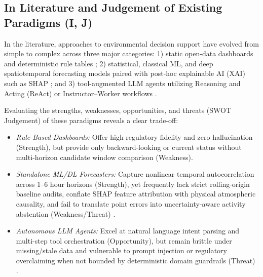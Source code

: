 \subsection{In Literature and Judgement of Existing Paradigms (I, J)}
In the literature, approaches to environmental decision support have evolved from simple to complex across three major categories: 1) static open-data dashboards and deterministic rule tables \cite{aqxp432,moenv2025aqi}; 2) statistical, classical ML, and deep spatiotemporal forecasting models paired with post-hoc explainable AI (XAI) such as SHAP \cite{chianese2026,joseph2025,lundberg2017,houdou2024,lo2025}; and 3) tool-augmented LLM agents utilizing Reasoning and Acting (ReAct) or Instructor--Worker workflows \cite{yao2023,nie2025,gao2025}.

Evaluating the strengths, weaknesses, opportunities, and threats (SWOT Judgement) of these paradigms reveals a clear trade-off:
\begin{itemize}
    \item \emph{Rule-Based Dashboards:} Offer high regulatory fidelity and zero hallucination (Strength), but provide only backward-looking or current status without multi-horizon candidate window comparison (Weakness).
    \item \emph{Standalone ML/DL Forecasters:} Capture nonlinear temporal autocorrelation across 1--6 hour horizons (Strength), yet frequently lack strict rolling-origin baseline audits, conflate SHAP feature attribution with physical atmospheric causality, and fail to translate point errors into uncertainty-aware activity abstention (Weakness/Threat) \cite{hewamalage2023,houdou2024,berlinghieri2026}.
    \item \emph{Autonomous LLM Agents:} Excel at natural language intent parsing and multi-step tool orchestration (Opportunity), but remain brittle under missing/stale data and vulnerable to prompt injection or regulatory overclaiming when not bounded by deterministic domain guardrails (Threat) \cite{nie2025,owasp2026}.
\end{itemize}

